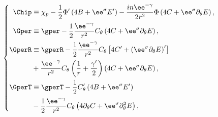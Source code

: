 \begin{equation}
\left\{
\begin{aligned}
\Chip &\equiv\displaystyle \chi_p - \frac{1}{2} \Phi'\left( 4 B +
\ee^\sigma E' \right) -\frac{i n \ee^{-\gamma}}{2 r^2} \Phi
\left(4C + \ee^\sigma \partial_\theta E \right),\\ \Gper & \equiv
\displaystyle \gper - \frac{1}{2} \frac{\ee^{-\gamma}}{r^2} C_\theta
\left(4C+\ee^{\sigma} \partial_\theta E \right),\\ \GperR & \equiv 
\displaystyle \gperR - \frac{1}{2} \frac{\ee^{-\gamma}}{r^2} C_\theta
\left[4C'+ \left(\ee^{\sigma} \partial_\theta E\right)' \right] \\ & +
\displaystyle \frac{\ee^{-\gamma}}{r^2} C_\theta \left(\frac{1}{r} +
\frac{\gamma'}{2} \right) \left(4C + \ee^{\sigma} \partial_\theta E
\right),\\ \GperT & \equiv \displaystyle \gperT - \frac{1}{2} C_\theta'
\left(4B+\ee^{\sigma} E' \right) \\ & - \displaystyle \frac{1}{2}
\frac{\ee^{-\gamma}}{r^2} C_\theta \left(4 \partial_\theta C +
\ee^{\sigma} \partial^2_\theta E \right),
\end{aligned}
\right.
\end{equation}


